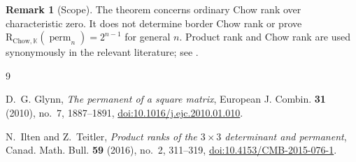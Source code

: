 \documentclass[11pt]{amsart}
\newcommand{\K}{\mathbb{K}}
\newcommand{\perm}{\operatorname{perm}}
\newcommand{\CR}{\mathrm{R}_{\mathrm{Chow},\K}}
\theoremstyle{definition}
\newtheorem{remark}[theorem]{Remark}
\begin{document}
\begin{remark}[Scope]
The theorem concerns ordinary Chow rank over characteristic zero. It does not
determine border Chow rank or prove \(\CR(\perm_n)=2^{n-1}\) for general
\(n\). Product rank and Chow rank are used synonymously in the relevant
literature; see \cite{IltenTeitler2016}.
\end{remark}

\begin{thebibliography}{9}

D.~G. Glynn,
\emph{The permanent of a square matrix},
European J. Combin. \textbf{31} (2010), no.~7, 1887--1891,
\href{https://doi.org/10.1016/j.ejc.2010.01.010}
{doi:10.1016/j.ejc.2010.01.010}.

N.~Ilten and Z.~Teitler,
\emph{Product ranks of the \(3\times3\) determinant and permanent},
Canad. Math. Bull. \textbf{59} (2016), no.~2, 311--319,
\href{https://doi.org/10.4153/CMB-2015-076-1}
{doi:10.4153/CMB-2015-076-1}.

\end{thebibliography}
\end{document}
